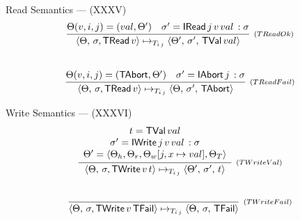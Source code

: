 \documentclass[14pt]{beamer}
\newcommand{\C}[1]{\red{\mathsf{#1}}}
\begin{document}
     \begin{frame}{Read Semantics --- (XXXV)}
\[
\begin{array}{c}
  \infer[_{(TReadOk)}]
        { \langle \Theta,\, \sigma, \ensuremath{\C{TRead}}\,v \rangle \mapsto_{T_{i\,j}}
          \langle \Theta',\, \sigma',\,\ensuremath{\C{TVal}}\,val\rangle }
        {\Theta(v,i,j) = (val,\Theta') & \sigma' = \ensuremath{\C{IRead}}\,j\,v\,val\,:\sigma}
  \\
  \\
  \\
  \infer[_{(TReadFail)}]
        { \langle \Theta,\, \sigma, \ensuremath{\C{TRead}}\,v \rangle \mapsto_{T_{i\,j}}
          \langle \Theta, \, \sigma',\, \ensuremath{\C{TAbort}} \rangle}
        {\Theta(v,i,j) = (\ensuremath{\C{TAbort}},\Theta') & \sigma' = \ensuremath{\C{IAbort}}\,j\,:\sigma} 
\end{array}
\]
     \end{frame}
     \begin{frame}{Write Semantics --- (XXXVI)}
\[
\begin{array}{c}
  \infer[_{(TWriteVal)}]
        { \langle \Theta, \, \sigma, \ensuremath{\C{TWrite}}\,v\,t\rangle \mapsto_{T_{i\,j}}
          \langle \Theta', \, \sigma',\,t\rangle}
        {\begin{array}{c}
            t = \ensuremath{\C{TVal}}\,val \\
            \sigma' = \ensuremath{\C{IWrite}}\,j\,v\,val\, : \sigma \\
            \Theta' = \langle \Theta_h, \Theta_r, \Theta_w[j,x \mapsto val], \Theta_T\rangle
         \end{array}}
  \\ \\ \\
  \infer[_{(TWriteFail)}]
        { \langle \Theta, \,\sigma, \ensuremath{\C{TWrite}}\,v\,\ensuremath{\C{TFail}}\rangle \mapsto_{T_{i\,j}}
          \langle \Theta, \, \sigma,\, \ensuremath{\C{TFail}} \rangle }
        { }
\end{array}
\]
     \end{frame}
\end{document}
